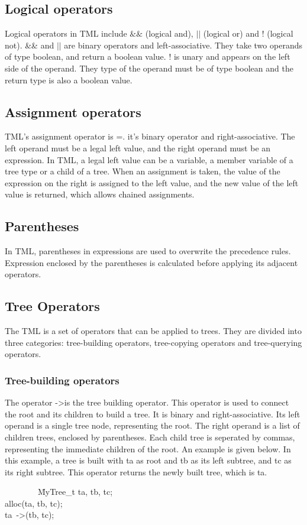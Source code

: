 \documentclass[12pt,psfig,a4]{article}
\begin{document}
\subsection{Logical operators}
Logical operators in TML include $\&\&$ (logical and), $||$ (logical or) and ! (logical not). \&\& and $||$ are binary operators and left-associative. They take two operands of type boolean, and return a boolean value. ! is unary and appears on the left side of the operand. They type of the operand must be of type boolean and the return type is also a boolean value.

\subsection{Assignment operators}
TML's assignment operator is =. it's binary operator and right-associative. The left operand must be a legal left value, and the right operand must be an expression. In TML, a legal left value can be a variable, a member variable of a tree type or a child of a tree. When an assignment is taken, the value of the expression on the right is assigned to the left value, and the new value of the left value is returned, which allows chained assignments. 

\subsection{Parentheses}
In TML, parentheses in expressions are used to overwrite the precedence rules. Expression enclosed by the parentheses is calculated before applying its adjacent operators.

\subsection{Tree Operators}
The TML is a set of operators that can be applied to trees. They are divided into three categories: tree-building operators, tree-copying operators and tree-querying operators.

\subsubsection{Tree-building operators}
The operator -\textgreater is the tree building operator. This operator is used to connect the root and its children to build a tree. It is binary and right-associative. Its left operand is a single tree node, representing the root. The right operand is a list of children trees, enclosed by parentheses. Each child tree is seperated by commas, representing the immediate children of the root. An example is given below. In this example, a tree is built with ta as root and tb as its left subtree, and tc as its right subtree. This operator returns the newly built tree, which is ta.
\begin{code}
\begin{tabbing}
~~~~~~~~\= MyTree\_t ta, tb, tc;\\
\> alloc(ta, tb, tc);\\
\> ta~-\textgreater(tb, tc);
\end{tabbing}
\end{code}
\end{document}

